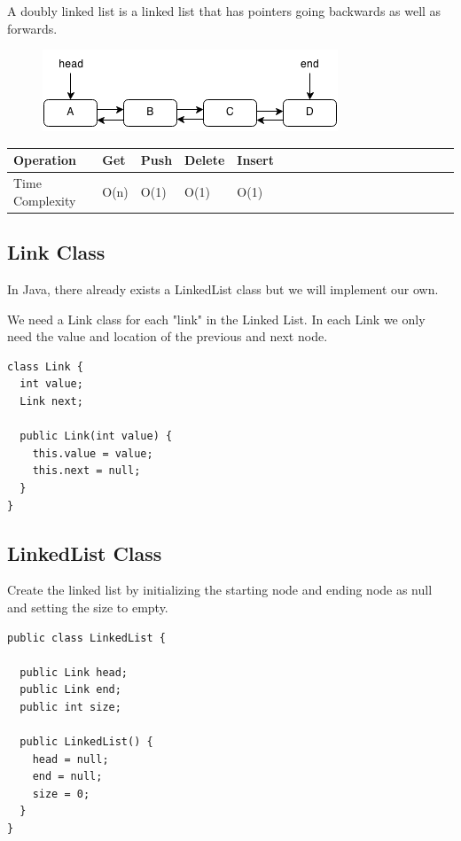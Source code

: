 \documentclass[11pt,oneside]{book}
\makeatletter
\def\maxwidth#1{\ifdim\Gin@nat@width>#1 #1\else\Gin@nat@width\fi}
\makeatother
\begin{document}
A doubly linked list is a linked list that has pointers going backwards as well as forwards.

\vspace{5px}\begin{figure}[H]\centering
        \includegraphics[width=0.66\maxwidth{\textwidth}]{doublelinkedlist.png}
        \end{figure}

\vspace{10px}\begin{tabulary}{0.4\linewidth}{|l|l|l|l|l|l|l|l|l|l|l|l|l|l|l|l|l|l|l}\hline


  Operation &
  Get &
  Push &
  Delete &
  Insert\\
\hline


  Time Complexity &
  O(n) &
  O(1) &
  O(1) &
  O(1)\\

\hline\end{tabulary}

\subsection{Link Class}

In Java, there already exists a LinkedList class but we will implement our own.

We need a Link class for each "link" in the Linked List. In each Link we only need the value and location of the previous and next node.

\begin{lstlisting}
class Link {
  int value;
  Link next;

  public Link(int value) {
    this.value = value;
    this.next = null;
  }
}
\end{lstlisting}

\subsection{LinkedList Class}

Create the linked list by initializing the starting node and ending node as null and setting the size to empty.

\begin{lstlisting}
public class LinkedList {

  public Link head;
  public Link end;
  public int size;

  public LinkedList() {
    head = null;
    end = null;
    size = 0;
  }
}
\end{lstlisting}
\end{document}

